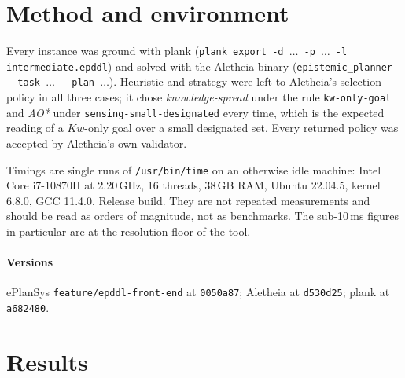 \documentclass[11pt,a4paper]{article}
\newcommand{\Kw}{\mathit{Kw}}
\begin{document}


\section{Method and environment}
\label{sec:method}

Every instance was ground with \textsf{plank}
(\texttt{plank export -d $\ldots$ -p $\ldots$ -l intermediate.epddl}) and
solved with the Aletheia binary
(\texttt{epistemic\_planner -{}-task $\ldots$ -{}-plan $\ldots$}). Heuristic and
strategy were left to Aletheia's selection policy in all three cases; it chose
\emph{knowledge-spread} under the rule \texttt{kw-only-goal} and \emph{AO*}
under \texttt{sensing-small-designated} every time, which is the expected
reading of a $\Kw$-only goal over a small designated set. Every returned policy
was accepted by Aletheia's own validator.

Timings are single runs of \texttt{/usr/bin/time} on an otherwise idle machine:
Intel Core i7-10870H at 2.20\,GHz, 16 threads, 38\,GB RAM, Ubuntu 22.04.5,
kernel 6.8.0, GCC 11.4.0, Release build. They are not repeated measurements and
should be read as orders of magnitude, not as benchmarks. The sub-10\,ms
figures in particular are at the resolution floor of the tool.

\paragraph{Versions} ePlanSys \texttt{feature/epddl-front-end} at
\texttt{0050a87}; Aletheia at \texttt{d530d25}; \textsf{plank} at
\texttt{a682480}.

\section{Results}
\label{sec:results}
\end{document}
